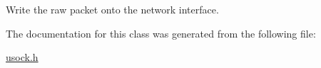 Write the raw packet onto the network interface. 



The documentation for this class was generated from the following file:\begin{CompactItemize}
\item 
\hyperlink{usock_8h}{usock.h}\end{CompactItemize}
